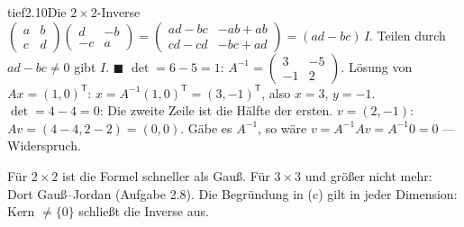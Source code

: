 \begin{loesungkarte}{tief}{2.10}{Die $2\times2$-Inverse}
$\begin{pmatrix}a & b\\ c & d\end{pmatrix}\begin{pmatrix}d & -b\\ -c & a\end{pmatrix} = \begin{pmatrix}ad - bc & -ab + ab\\ cd - cd & -bc + ad\end{pmatrix} = (ad - bc)\,I$. Teilen durch $ad - bc\neq0$ gibt $I$. $\blacksquare$
$\det = 6 - 5 = 1$: $A^{-1} = \begin{pmatrix}3 & -5\\ -1 & 2\end{pmatrix}$. Lösung von $Ax = (1, 0)^{\mathsf T}$: $x = A^{-1}(1, 0)^{\mathsf T} = (3, -1)^{\mathsf T}$, also $x = 3$, $y = -1$.
$\det = 4 - 4 = 0$: Die zweite Zeile ist die Hälfte der ersten. $v = (2, -1)$: $Av = (4 - 4, 2 - 2) = (0, 0)$. Gäbe es $A^{-1}$, so wäre $v = A^{-1}Av = A^{-1}0 = 0$ --- Widerspruch.
\begin{mitnehmen}\kastentext
Für $2\times2$ ist die Formel schneller als Gauß. Für $3\times3$ und größer nicht mehr: Dort Gauß--Jordan (Aufgabe 2.8). Die Begründung in (c) gilt in jeder Dimension: Kern $\neq\{0\}$ schließt die Inverse aus.
\end{mitnehmen}
\end{loesungkarte}

